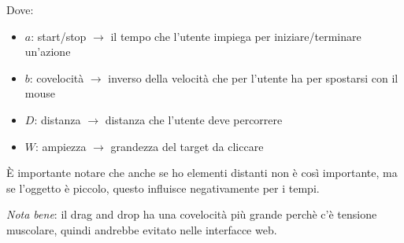 Dove:
\begin{itemize}

\item $a$: start/stop $\to$ il tempo che l'utente impiega per iniziare/terminare un'azione
\item $b$: covelocit\`a $\to$ inverso della velocit\`a che per l'utente ha per spostarsi con il mouse
\item $D$: distanza $\to$ distanza che l'utente deve percorrere
\item $W$: ampiezza $\to$ grandezza del target da cliccare

\end{itemize}

\`E importante notare che anche se ho elementi distanti non \`e  cos\`i importante, ma se l'oggetto \`e piccolo, questo influisce negativamente per i tempi.

\textit{Nota bene}: il drag and drop ha una covelocit\`a pi\`u grande perch\`e c'\`e tensione muscolare, quindi andrebbe evitato nelle interfacce web.
